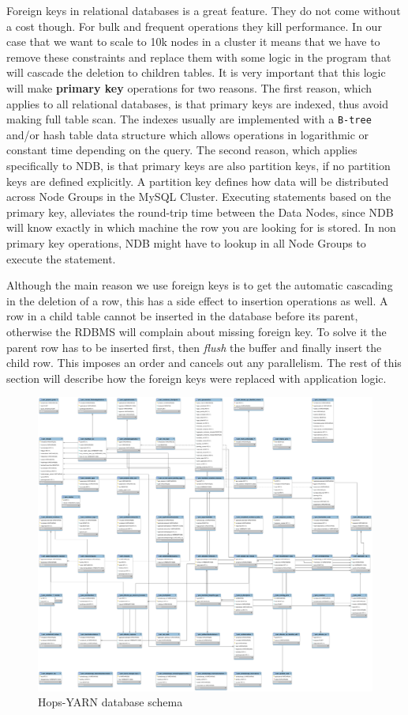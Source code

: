 Foreign keys in relational databases is a great feature. They do not
come without a cost though. For bulk and frequent operations they kill
performance. In our case that we want to scale to 10k nodes in a
cluster it means that we have to remove these constraints and replace
them with some logic in the program that will cascade the deletion to
children tables. It is very important that this logic will make
\textbf{primary key} operations for two reasons. The first reason, which
applies to all relational databases, is that primary keys are indexed,
thus avoid making full table scan. The indexes usually are
implemented with a \texttt{B-tree} and/or hash table data structure which allows
operations in logarithmic or constant time depending on the query. The second reason, which applies
specifically to NDB, is that primary keys are also partition keys, if
no partition keys are defined explicitly. A
partition key defines how data will be distributed across Node Groups
in the MySQL Cluster. Executing statements based on the primary key,
alleviates the round-trip time between the Data Nodes, since NDB will
know exactly in which machine the row you are looking for is
stored. In non primary key operations, NDB might have to lookup in all
Node Groups to execute the statement.

Although the main reason we use foreign keys is to get the
automatic cascading in the deletion of a row, this has a side effect to
insertion operations as well. A row in a child table cannot be inserted
in the database before its parent, otherwise the RDBMS will complain
about missing foreign key. To solve it the parent row has to be
inserted first, then \emph{flush} the buffer and finally insert the child row. This
imposes an order and cancels out any parallelism. The rest of this
section will describe how the foreign keys were replaced with
application logic.

\begin{figure}
\centering
\includegraphics[scale=0.2,angle=90]{resources/images/Implementation/hops_yarn_ndb_schema_full.png}
\caption{Hops-YARN database schema}
\label{fig:impl_fk_yarn_schema}
\end{figure}

